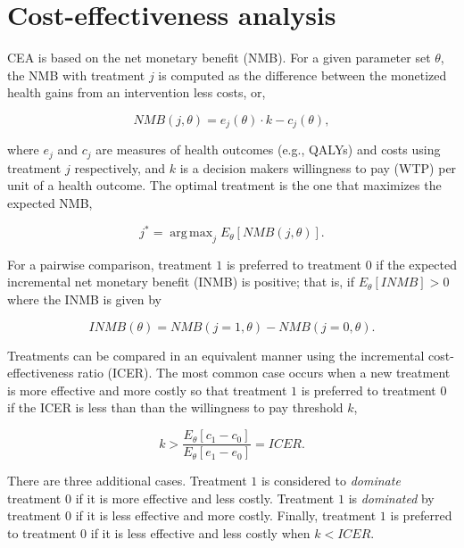 \documentclass[article, nojss]{jss}\usepackage[]{graphicx}\usepackage[]{color}
\DeclareMathOperator*{\argmax}{arg\,max}
\begin{document}
\section{Cost-effectiveness analysis} \label{sec:cea}
CEA is based on the net monetary benefit (NMB). For a given parameter set $\theta$, the NMB with treatment $j$ is computed as the difference between the monetized health gains from an intervention less costs, or,

\begin{equation}
NMB(j,\theta) = e_{j}(\theta)\cdot k- c_{j}(\theta),
\end{equation}

where $e_{j}$ and $c_{j}$ are measures of health outcomes (e.g., QALYs) and costs using treatment $j$ respectively, and $k$ is a decision makers willingness to pay (WTP) per unit of a health outcome. The optimal treatment is the one that maximizes the expected NMB,

\begin{equation}
j^{*} = \argmax_j E_{\theta} \left[NMB(j,\theta)\right].
\end{equation}

For a pairwise comparison, treatment $1$ is preferred to treatment $0$ if the expected incremental net monetary benefit (INMB) is positive; that is, if $E_\theta \left[INMB\right] > 0$ where the INMB is given by

\begin{equation}
INMB(\theta) = NMB(j = 1, \theta) - NMB(j = 0, \theta).
\end{equation}

Treatments can be compared in an equivalent manner using the incremental cost-effectiveness ratio (ICER). The most common case occurs when a new treatment is more effective and more costly so that treatment $1$ is preferred to treatment $0$ if the ICER is less than than the willingness to pay threshold $k$,

\begin{equation}
k > \frac{E_\theta[c_{1} - c_{0}]}{E_\theta[e_{1} - e_{0}]} = ICER.
\end{equation}

There are three additional cases. Treatment $1$ is considered to \emph{dominate} treatment $0$ if it is more effective and less costly. Treatment $1$ is \emph{dominated} by treatment $0$ if it is less effective and more costly. Finally, treatment $1$ is preferred to treatment $0$ if it is less effective and less costly when $k < ICER$. 
\end{document}

